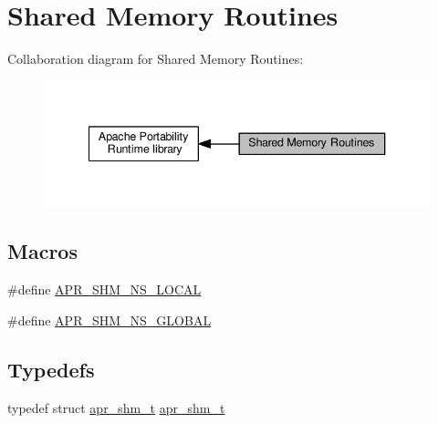 \hypertarget{group__apr__shm}{}\section{Shared Memory Routines}
\label{group__apr__shm}
Collaboration diagram for Shared Memory Routines\+:
\nopagebreak
\begin{figure}[H]
\begin{center}
\leavevmode
\includegraphics[width=340pt]{group__apr__shm}
\end{center}
\end{figure}
\subsection*{Macros}
\begin{DoxyCompactItemize}
\item 
\#define \hyperlink{group__apr__shm_ga47cc28ddc5f32cf904383b9e4f82825b}{A\+P\+R\+\_\+\+S\+H\+M\+\_\+\+N\+S\+\_\+\+L\+O\+C\+AL}
\item 
\#define \hyperlink{group__apr__shm_ga0de8e4acab42e7ff8e35e5ac9620f667}{A\+P\+R\+\_\+\+S\+H\+M\+\_\+\+N\+S\+\_\+\+G\+L\+O\+B\+AL}
\end{DoxyCompactItemize}
\subsection*{Typedefs}
\begin{DoxyCompactItemize}
\item 
typedef struct \hyperlink{structapr__shm__t}{apr\+\_\+shm\+\_\+t} \hyperlink{group__apr__shm_ga79e8c16bdeaf7ade4ef0f935249e7c2f}{apr\+\_\+shm\+\_\+t}
\end{DoxyCompactItemize}
